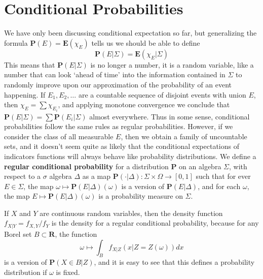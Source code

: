\section{Conditional Probabilities}

We have only been discussing conditional expectation so far, but generalizing the formula $\mathbf{P}(E) = \mathbf{E}(\chi_E)$ tells us we should be able to define
%
\[ \mathbf{P}(E|\Sigma) = \mathbf{E}(\chi_E | \Sigma) \]
%
This means that $\mathbf{P}(E|\Sigma)$ is no longer a number, it is a random variable, like a number that can look `ahead of time' into the information contained in $\Sigma$ to randomly improve upon our approximation of the probability of an event happening. If $E_1, E_2, \dots$ are a countable sequence of disjoint events with union $E$, then $\chi_E = \sum \chi_{E_i}$, and applying monotone convergence we conclude that $\mathbf{P}(E|\Sigma) = \sum \mathbf{P}(E_i|\Sigma)$ almost everywhere. Thus in some sense, conditional probabilities follow the same rules as regular probabilities. However, if we consider the class of all measurable $E$, then we obtain a family of uncountable sets, and it doesn't seem quite as likely that the conditional expectations of indicators functions will always behave like probability distributions. We define a {\bf regular conditional probability} for a distribution $\mathbf{P}$ on an algebra $\Sigma$, with respect to a $\sigma$ algebra $\Delta$ as a map $\mathbf{P}(\cdot |\Delta): \Sigma \times \Omega \to [0,1]$ such that for ever $E \in \Sigma$, the map $\omega \mapsto \mathbf{P}(E|\Delta)(\omega)$ is a version of $\mathbf{P}(E|\Delta)$, and for each $\omega$, the map $E \mapsto \mathbf{P}(E|\Delta)(\omega)$ is a probability measure on $\Sigma$.

\begin{example}
    If $X$ and $Y$ are continuous random variables, then the density function $f_{X|Y} = f_{X,Y}/f_Y$ is the density for a regular conditional probability, because for any Borel set $B \subset \mathbf{R}$, the function
    \[ \omega \mapsto \int_B f_{X|Z}(x|Z = Z(\omega)) dx \]
    is a version of $\mathbf{P}(X \in B|Z)$, and it is easy to see that this defines a probability distribution if $\omega$ is fixed.
\end{example}

